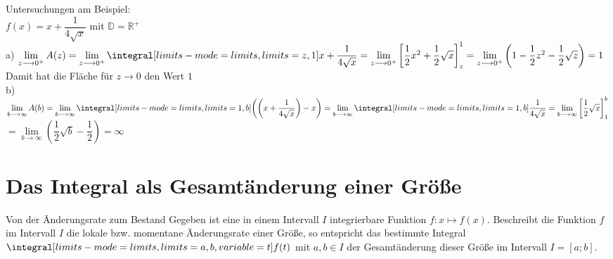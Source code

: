 \begin{rechnung}{}{}
   Untersuchungen am Beispiel: \\[0.3cm]$f(x)= x+\dfrac{1}{4\sqrt{x}}$ \hspace{0.3cm} mit \hspace{0.3cm} $\mathds{D}= \mathds{R}^+$ \\[0.3cm] a) $\lim\limits_{z \longrightarrow 0^+} A(z) = \lim\limits_{z \longrightarrow 0^+}\integral[limits-mode=limits,limits={z, 1}]{x+\dfrac{1}{4\sqrt{x}}} = \lim\limits_{z \longrightarrow 0^+}\left[\dfrac{1}{2}x^2 + \dfrac{1}{2} \sqrt{x}\right]_z^1 = \lim\limits_{z \longrightarrow 0^+} \left(1-\dfrac{1}{2}z^2 - \dfrac{1}{2}\sqrt{z}\right)= 1$\\[0.3cm] Damit hat die Fläche für $z\longrightarrow 0$ den Wert $1$\\[0.3cm] b) $\lim\limits_{b \longrightarrow \infty} A(b) = \lim\limits_{b \longrightarrow \infty}\integral[limits-mode=limits,limits={1, b}]{\left(\left(x+\dfrac{1}{4\sqrt{x}}\right)-x\right)} = \lim\limits_{b \longrightarrow \infty}\integral[limits-mode=limits,limits={1, b}]{\dfrac{1}{4\sqrt{x}}} =\lim\limits_{b \longrightarrow \infty}  \left[\dfrac{1}{2} \sqrt{x}\right]_1^b $  \\[0.3cm] $=\lim\limits_{b \longrightarrow \infty} \left(\dfrac{1}{2} \sqrt{b} -\dfrac{1}{2}\right) = \infty$
\end{rechnung}
\section{Das Integral als Gesamtänderung einer Größe}
\begin{defi}{Von der Änderungsrate zum Bestand}{}
    Gegeben ist eine in einem Intervall $I$ integrierbare Funktion $f:x\mapsto f(x)$. Beschreibt die Funktion $f$ im Intervall $I$ die lokale bzw. momentane Änderungsrate einer Größe, so entspricht das bestimmte Integral $\integral[limits-mode=limits,limits={a, b}, variable ={t}]{f(t)}$ mit $a,b \in I$ der Gesamtänderung dieser Größe im Intervall $I=[a;b]$.
\end{defi}
